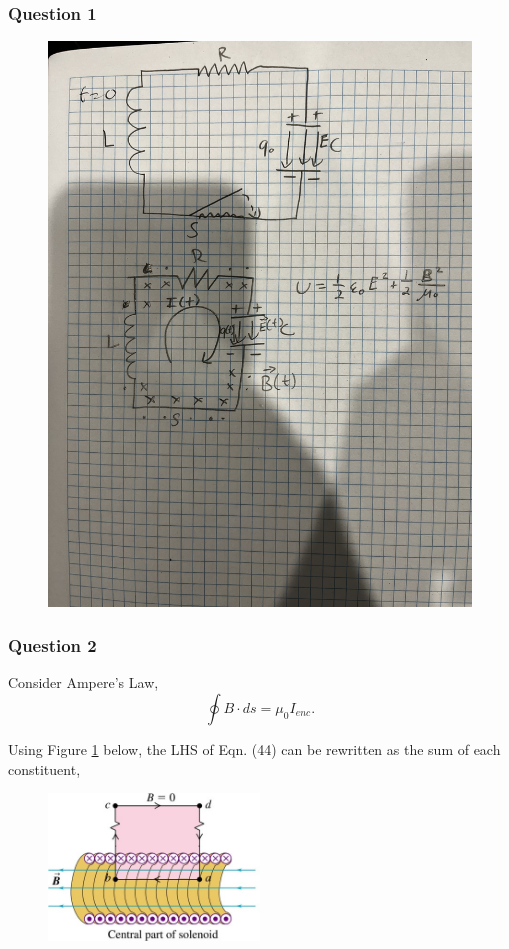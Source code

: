 \documentclass{article}
\begin{document}
\subsubsection{Question 1}
\begin{figure}[H]
    \centering
    \includegraphics[width=1\textwidth,angle=270]{q1.jpg}
\end{figure}
\subsubsection{Question 2}
Consider Ampere's Law,
\begin{equation}
    \oint{B\cdot ds} = \mu_0I_{enc}.
\end{equation}

Using Figure \ref{fig:diagram2} below, the LHS of Eqn. (44)
can be rewritten as the sum of each constituent,

\begin{figure}[H]
    \centering
    \includegraphics[width=0.5\textwidth]{diagram1.jpeg}
    \label{fig:diagram2}
\end{figure}
\end{document}
